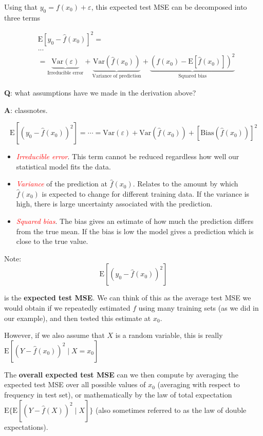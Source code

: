 \documentclass[ignorenonframetext,]{beamer}
\begin{document}
\begin{frame}

Using that \(y_0=f(x_0)+\varepsilon\), this expected test MSE can be
decomposed into three terms

\begin{align*}
&\text{E}[y_0 - \hat{f}(x_0)]^2 = \\
& ... \\
& =  \underbrace{\text{Var}(\varepsilon)}_{\text{Irreducible error}} + \underbrace{\text{Var}(\hat{f}(x_0))}_{\text{Variance of prediction}} + \underbrace{\left( f(x_0) - \text{E}[\hat{f}(x_0)] \right)^2}_{\text{Squared bias}}
\end{align*}

\textbf{Q}: what assumptions have we made in the derivation above?

\textbf{A}: classnotes.

\end{frame}

\begin{frame}

\[\text{E}[(y_0 - \hat{f}(x_0))^2]=\cdots=\text{Var}(\varepsilon) +  \text{Var}(\hat{f}(x_0))+[\text{Bias}(\hat{f}(x_0))]^2\]

\begin{itemize}
\item
  \emph{\textcolor{red}{Irreducible error}}. This term cannot be reduced
  regardless how well our statistical model fits the data.
\item
  \emph{\textcolor{red}{Variance}} of the prediction at
  \(\hat{f}(x_0)\). Relates to the amount by which \(\hat{f}(x_0)\) is
  expected to change for different training data. If the variance is
  high, there is large uncertainty associated with the prediction.
\item
  \emph{\textcolor{red}{Squared bias}}. The bias gives an estimate of
  how much the prediction differs from the true mean. If the bias is low
  the model gives a prediction which is close to the true value.
\end{itemize}

\end{frame}

\begin{frame}

Note: \[\text{E}[(y_0 - \hat{f}(x_0))^2]\]

is the \textbf{expected test MSE}. We can think of this as the average
test MSE we would obtain if we repeatedly estimated \(f\) using many
training sets (as we did in our example), and then tested this estimate
at \(x_0\).

However, if we also assume that \(X\) is a random variable, this is
really \(\text{E}[(Y - \hat{f}(x_0))^2 \mid X=x_0]\)

The \textbf{overall expected test MSE} can we then compute by averaging
the expected test MSE over all possible values of \(x_0\) (averaging
with respect to frequency in test set), or mathematically by the law of
total expectation \(\text{E} \{ \text{E}[(Y - \hat{f}(X))^2 \mid X]\}\)
(also sometimes referred to as the law of double expectations).

\end{frame}
\end{document}
